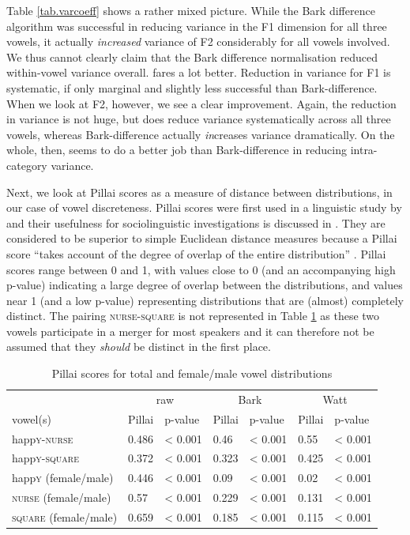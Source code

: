 Table \ref{tab.varcoeff} shows a rather mixed picture. While the Bark difference algorithm was successful in reducing variance in the F1 dimension for all three vowels, it actually \emph{increased} variance of F2 considerably for all vowels involved. We thus cannot clearly claim that the Bark difference normalisation reduced within-vowel variance overall.
\citeauthor{wattfabricius2002} fares a lot better.
Reduction in variance for F1 is systematic, if only marginal and slightly less successful than Bark-difference.
When we look at F2, however, we see a clear improvement.
Again, the reduction in variance is not huge, but \citeauthor{wattfabricius2002} does reduce variance systematically across all three vowels, whereas Bark-difference actually \emph{in}creases variance dramatically.
On the whole, then, \citeauthor{wattfabricius2002} seems to do a better job than Bark-difference in reducing intra-category variance.

Next, we look at Pillai scores as a measure of distance between distributions, in our case of vowel discreteness.
Pillai scores were first used in a linguistic study by \textcite{hayetal2006b} and their usefulness for sociolinguistic investigations is discussed in \citealt{halllew2010}.
They are considered to be superior to simple Euclidean distance measures because a Pillai score ``takes account of the degree of overlap of the entire distribution'' \parencite[467]{hayetal2006b}.
Pillai scores range between 0 and 1, with values close to 0 (and an accompanying high p-value) indicating a large degree of overlap between the distributions, and values near 1 (and a low p-value) representing distributions that are (almost) completely distinct.
The pairing \textsc{nurse-square} is not represented in Table \ref{tab.pillai} as these two vowels participate in a merger for most speakers and it can therefore not be assumed that they \emph{should} be distinct in the first place.

\begin{table}[h]
	\centering
	\caption{Pillai scores for total and female/male vowel distributions}
	\begin{tabular}{lllllll}
		\hline
		& \multicolumn{2}{c}{raw} & \multicolumn{2}{c}{Bark} & \multicolumn{2}{c}{Watt}\\
		vowel(s) & Pillai & p-value & Pillai & p-value & Pillai & p-value\\
		\hline
		happ\textsc{y}-\textsc{nurse} &
		0.486 &
		< 0.001 &
		0.46 &
		< 0.001 &
		0.55 &
		< 0.001\\
		happ\textsc{y}-\textsc{square} &
		0.372 &
		< 0.001 &
		0.323 &
		< 0.001 &
		0.425 &
		< 0.001 \\
		happ\textsc{y} (female/male) &
		0.446 &
		< 0.001 &
		0.09 &
		< 0.001 &
		0.02 &
		< 0.001 \\
		\textsc{nurse} (female/male) &
		0.57 &
		< 0.001 &
		0.229 &
		< 0.001 &
		0.131 &
		< 0.001 \\
		\textsc{square} (female/male) &
		0.659 &
		< 0.001 &
		0.185 &
		< 0.001 &
		0.115 &
		< 0.001 \\
		\hline
	\end{tabular}
	\label{tab.pillai}
\end{table}

